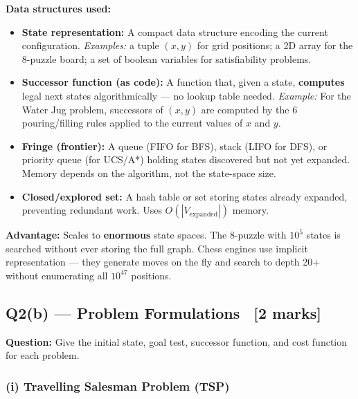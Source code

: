 \documentclass[12pt, a4paper]{article}
\newenvironment{solutionbox}{\begin{mdframed}[style=solutionframe]}{\end{mdframed}}
\begin{document}
\textbf{Data structures used:}
\begin{itemize}[noitemsep]
  \item \textbf{State representation:} A compact data structure encoding the current configuration. \emph{Examples:} a tuple $(x,y)$ for grid positions; a 2D array for the 8-puzzle board; a set of boolean variables for satisfiability problems.
  \item \textbf{Successor function (as code):} A function that, given a state, \textbf{computes} legal next states algorithmically — no lookup table needed. \emph{Example:} For the Water Jug problem, successors of $(x,y)$ are computed by the 6 pouring/filling rules applied to the current values of $x$ and $y$.
  \item \textbf{Fringe (frontier):} A queue (FIFO for BFS), stack (LIFO for DFS), or priority queue (for UCS/A*) holding states discovered but not yet expanded. Memory depends on the algorithm, not the state-space size.
  \item \textbf{Closed/explored set:} A hash table or set storing states already expanded, preventing redundant work. Uses $O(|V_{\text{expanded}}|)$ memory.
\end{itemize}

\noindent\textbf{Advantage:} Scales to \textbf{enormous} state spaces. The 8-puzzle with $10^5$ states is searched without ever storing the full graph. Chess engines use implicit representation — they generate moves on the fly and search to depth 20+ without enumerating all $10^{47}$ positions.

\subsection{Q2(b) — Problem Formulations \ [2 marks]}

\begin{solutionbox}
\textbf{Question:} Give the initial state, goal test, successor function, and cost function for each problem.
\end{solutionbox}

\subsubsection*{(i) Travelling Salesman Problem (TSP)}
\end{document}
